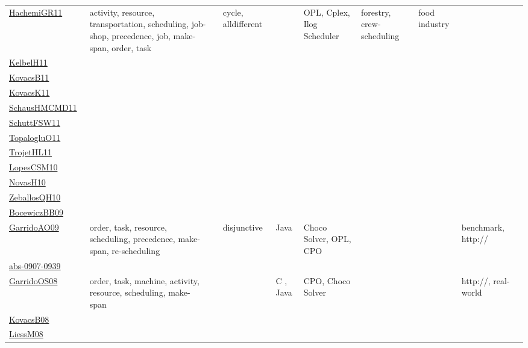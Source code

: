 {\begin{longtable}{p{3cm}p{4cm}p{2cm}p{2cm}p{2cm}p{2cm}p{2cm}p{2cm}p{2cm}p{2cm}}
\href{articles/HachemiGR11.pdf}{HachemiGR11}~\cite{HachemiGR11} & activity, resource, transportation, scheduling, job-shop, precedence, job, make-span, order, task &  & cycle, alldifferent &  & OPL, Cplex, Ilog Scheduler & forestry, crew-scheduling & food industry &  & \\
\href{articles/KelbelH11.pdf}{KelbelH11}~\cite{KelbelH11} &  &  &  &  &  &  &  &  & \\
\href{articles/KovacsB11.pdf}{KovacsB11}~\cite{KovacsB11} &  &  &  &  &  &  &  &  & \\
\href{articles/KovacsK11.pdf}{KovacsK11}~\cite{KovacsK11} &  &  &  &  &  &  &  &  & \\
\href{articles/SchausHMCMD11.pdf}{SchausHMCMD11}~\cite{SchausHMCMD11} &  &  &  &  &  &  &  &  & \\
\href{articles/SchuttFSW11.pdf}{SchuttFSW11}~\cite{SchuttFSW11} &  &  &  &  &  &  &  &  & \\
\href{articles/TopalogluO11.pdf}{TopalogluO11}~\cite{TopalogluO11} &  &  &  &  &  &  &  &  & \\
\href{articles/TrojetHL11.pdf}{TrojetHL11}~\cite{TrojetHL11} &  &  &  &  &  &  &  &  & \\
\href{articles/LopesCSM10.pdf}{LopesCSM10}~\cite{LopesCSM10} &  &  &  &  &  &  &  &  & \\
\href{articles/NovasH10.pdf}{NovasH10}~\cite{NovasH10} &  &  &  &  &  &  &  &  & \\
\href{articles/ZeballosQH10.pdf}{ZeballosQH10}~\cite{ZeballosQH10} &  &  &  &  &  &  &  &  & \\
\href{}{BocewiczBB09}~\cite{BocewiczBB09} &  &  &  &  &  &  &  &  & \\
\href{articles/GarridoAO09.pdf}{GarridoAO09}~\cite{GarridoAO09} & order, task, resource, scheduling, precedence, make-span, re-scheduling &  & disjunctive & Java & Choco Solver, OPL, CPO &  &  & benchmark, http:// & \\
\href{articles/abs-0907-0939.pdf}{abs-0907-0939}~\cite{abs-0907-0939} &  &  &  &  &  &  &  &  & \\
\href{articles/GarridoOS08.pdf}{GarridoOS08}~\cite{GarridoOS08} & order, task, machine, activity, resource, scheduling, make-span &  &  & C , Java & CPO, Choco Solver &  &  & http://, real-world & \\
\href{articles/KovacsB08.pdf}{KovacsB08}~\cite{KovacsB08} &  &  &  &  &  &  &  &  & \\
\href{articles/LiessM08.pdf}{LiessM08}~\cite{LiessM08} &  &  &  &  &  &  &  &  & \\

\end{longtable}}
